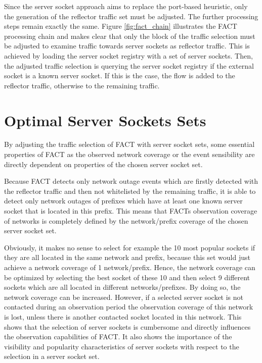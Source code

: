 Since the \gls{server socket} approach aims to replace the port-based heuristic, 
only the generation of the reflector traffic set must be adjusted. The further 
processing steps remain exactly the same. Figure \ref{fig:fact_chain} 
illustrates the \gls{FACT} processing chain and makes clear that only the block 
of the traffic selection must be adjusted to examine traffic towards 
\glspl{server socket} as reflector traffic. This is achieved by loading the 
\gls{server socket} registry with a set of \glspl{server socket}. Then, the 
adjusted traffic selection is querying the server socket registry if the 
external socket is a known \gls{server socket}. If this is the case, the flow is 
added to the reflector traffic, otherwise to the remaining traffic. 

\section{Optimal Server Sockets Sets\label{section:ses_selection}}
By adjusting the traffic selection of \gls{FACT} with \gls{server socket} sets, some essential properties of \gls{FACT} as the observed network coverage or the event sensibility are directly dependent on properties of the chosen 
\gls{server socket} set. 

Because \gls{FACT} detects only network outage events which are firstly detected with the reflector traffic and then not whitelisted by the remaining traffic, it is able to detect only network outages of prefixes which have at least one known 
server socket that is located in this prefix. This means that FACTs observation 
coverage of networks is completely defined by the network/prefix coverage of the 
chosen \gls{server socket} set. 

Obviously, it makes no sense to select for example the 10 most popular sockets 
if they are all located in the same network and prefix, because this set would 
just achieve a network coverage of 1 network/prefix. Hence, the network coverage 
can be optimized by selecting the best socket of these 10 and then select 9 
different sockets which are all located in different networks/prefixes. By doing 
so, the network coverage can be increased. However, if a selected 
\gls{server socket} is not contacted during an observation period the 
observation coverage of this network is lost, unless there is another contacted 
socket located in this network. 
This shows that the selection of \glspl{server socket} is cumbersome and 
directly influences the observation capabilities of FACT. It also shows the 
importance of the visibility and popularity characteristics of 
\glspl{server socket} with respect to the selection in a \gls{server socket} 
set. 

